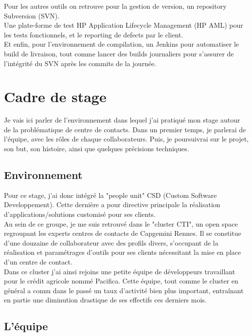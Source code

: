 \documentclass{rapport}
\begin{document}
Pour les autres outils on retrouve pour la gestion de version, un repository Subversion (SVN).\\
Une plate-forme de test HP Application Lifecycle Management (HP AML) pour les tests fonctionnels, et le reporting de defects par le client.\\
Et enfin, pour l'environnement de compilation, un Jenkins pour automatiser le build de livraison, tout comme lancer des builds journaliers pour s'assurer de l'intégrité du SVN après les commits de la journée.


\newpage

\section{Cadre de stage}

Je vais ici parler de l'environnement dans lequel j'ai pratiqué mon stage autour de la problématique de centre de contacts.
Dans un premier temps, je parlerai de l'équipe, avec les rôles de chaque collaborateurs. Puis, je poursuivrai sur le projet, son but, son histoire, ainsi que quelques précisions techniques.

\subsection{Environnement}

Pour ce stage, j'ai donc intégré la "people unit" CSD (Custom Software Developpement). Cette dernière a pour directive principale la réalisation d'applications/solutions customisé pour ses clients.\\

Au sein de ce groupe, je me suis retrouvé dans le "cluster CTI", un open space regroupant les experts centres de contacts de Capgemini Rennes. Il se constitue d'une douzaine de collaborateur avec des profils divers, s'occupant de la réalisation et paramétrages d'outils pour ses clients nécessitant la mise en place d'un centre de contact.\\

Dans ce cluster j'ai ainsi rejoins une petite équipe de développeurs travaillant pour le crédit agricole nommé Pacifica. Cette équipe, tout comme le cluster en général a connu dans le passé un taux d'activité bien plus important, entraînant en partie une diminution drastique de ses effectifs ces derniers mois.

\subsection{L'équipe}
\end{document}
